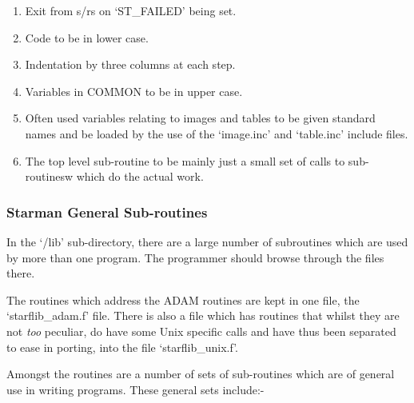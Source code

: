 \begin{enumerate}
\item Exit from s/rs on `ST\_FAILED' being set.

\item Code to be in lower case.

\item Indentation by three columns at each step.

\item Variables in COMMON to be in upper case.

\item Often used variables relating to images and tables to
      be given standard names and be loaded by the use of the
      `image.inc' and `table.inc' include files.

\item The top level sub-routine to be mainly just a small set of
      calls to sub-routinesw which do the actual work.

\end{enumerate}

\subsubsection{Starman General Sub-routines}

In the `/lib' sub-directory, there are a large number of subroutines
which are used by more than one program. The programmer should browse
through the files there.

The routines which address the ADAM routines are kept in one file, the
`starflib\_adam.f' file. There is also a file which has routines that
whilst they are not {\em too} peculiar, do have some Unix specific
calls and have thus been separated to ease in porting, into the file
`starflib\_unix.f'.

Amongst the routines are a number of sets of sub-routines which are of
general use in writing programs. These general sets include:-

